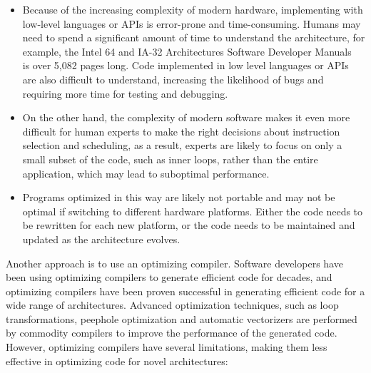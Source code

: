 \begin{itemize}
%
\item Because of the increasing complexity of modern hardware,
implementing with low-level languages or APIs is error-prone and
time-consuming. Humans may need to spend a significant amount of time
to understand the architecture, for example, the Intel 64 and IA-32
Architectures Software Developer Manuals~\cite{intelmanual} is over
5,082 pages long.
%
Code implemented in low level languages or APIs are also difficult to
understand, increasing the likelihood of bugs and requiring more time
for testing and debugging.

\item On the other hand, the complexity of modern software makes it even
more difficult for human experts to make the right decisions about
instruction selection and scheduling, as a result, experts are likely
to focus on only a small subset of the code, such as inner loops,
rather than the entire application, which may lead to suboptimal
performance.

\item Programs optimized in this way are likely not portable and
may not be optimal if switching to different hardware platforms.
%
Either the code needs to be rewritten for each new platform, or the
code needs to be maintained and updated as the architecture evolves.

\end{itemize}


Another approach is to use an optimizing compiler.
%
Software developers have been using optimizing compilers to generate
efficient code for decades, and optimizing compilers have been proven
successful in generating efficient code for a wide range of
architectures.
%
Advanced optimization techniques, such as loop transformations,
peephole optimization and automatic vectorizers are performed by
commodity compilers to improve the performance of the generated code.
%
However, optimizing compilers have several limitations, making them
less effective in optimizing code for novel architectures:

